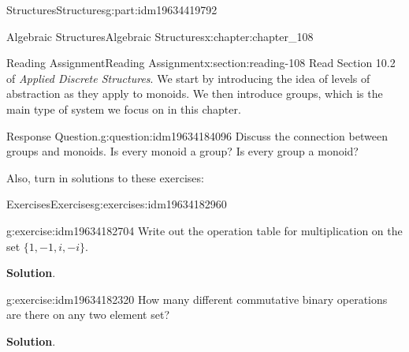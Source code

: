 \documentclass[oneside,10pt,]{book}
\newcommand{\blocktitlefont}{\relax}
\numberwithin{equation}{section}
\begin{document}
\begin{partptx}{Structures}{}{Structures}{}{}{g:part:idm19634419792}
\typeout{************************************************}
%
\begin{chapterptx}{Algebraic Structures}{}{Algebraic Structures}{}{}{x:chapter:chapter_108}
\index{}%
%
%
\typeout{************************************************}
\typeout{************************************************}
%
\begin{sectionptx}{Reading Assignment}{}{Reading Assignment}{}{}{x:section:reading-108}
Read Section 10.2 of \emph{Applied Discrete Structures}. We start by introducing the idea of levels of abstraction as they apply to monoids.  We then introduce groups, which is the main type of system we focus on in this chapter.%
\begin{question}{Response Question.}{g:question:idm19634184096}%
Discuss the connection between groups and monoids. Is every monoid a group? Is every group a monoid?%
\end{question}
Also, turn in solutions to these exercises:%
%
%
\typeout{************************************************}
\typeout{************************************************}
%
\begin{exercises-subsection-numberless}{Exercises}{}{Exercises}{}{}{g:exercises:idm19634182960}
\par\medskip\noindent%
%
\begin{exercisegroup}
\begin{divisionexerciseeg}{1}{}{}{g:exercise:idm19634182704}%
Write out the operation table for multiplication on the set \(\{1,-1,i, -i\}\).%
\par\smallskip%
\noindent\textbf{\blocktitlefont Solution}.\hypertarget{g:solution:idm19634182576}{}\quad{}%
\end{divisionexerciseeg}%
\begin{divisionexerciseeg}{2}{}{}{g:exercise:idm19634182320}%
How many different commutative binary operations are there on any two element set?%
\par\smallskip%
\noindent\textbf{\blocktitlefont Solution}.\hypertarget{g:solution:idm19634181408}{}\quad{}%
\end{divisionexerciseeg}%
\end{exercisegroup}
\par\medskip\noindent
\end{exercises-subsection-numberless}
\end{sectionptx}
%
%
\typeout{************************************************}

\end{chapterptx}
\end{partptx}
\end{document}
